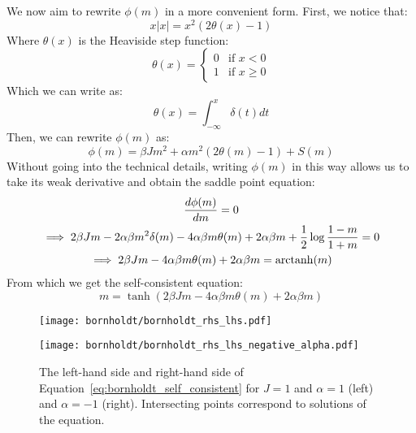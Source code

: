 We now aim to rewrite $\phi(m)$ in a more convenient form. First, we notice that:
\begin{equation}
    x|x| = x^2 (2\theta(x)-1)
\end{equation}
Where $\theta(x)$ is the Heaviside step function:
\begin{equation}
    \theta(x) = \begin{cases}
        0 & \text{if } x < 0\\
        1 & \text{if } x \geq 0
    \end{cases}
\end{equation}
Which we can write as:
\begin{equation}
    \theta(x) = \int_{-\infty}^{x} \delta(t) dt
\end{equation}
Then, we can rewrite $\phi(m)$ as:
\begin{equation}
    \phi(m) = \beta J m^2 + \alpha m^2 (2\theta(m)-1) + S(m)
\end{equation}
Without going into the technical details, writing $\phi(m)$ in this way allows us to take its weak derivative and obtain the saddle point equation:
\begin{equation}
    \begin{gathered}
        \frac{d \phi(m)}{d m} = 0\\
        \implies 2\beta J m - 2 \alpha \beta m^2 \delta(m) - 4 \alpha \beta m \theta(m) + 2\alpha \beta m + \frac{1}{2} \log \frac{1-m}{1+m} = 0\\
        \implies 2\beta J m - 4 \alpha \beta m \theta(m) + 2\alpha \beta m = \operatorname{arctanh}(m)\\
    \end{gathered}
\end{equation}
From which we get the self-consistent equation:
\begin{equation}
    m = \tanh\left(2\beta J m - 4 \alpha \beta m \theta(m) + 2\alpha \beta m\right)
    \label{eq:bornholdt_self_consistent}
\end{equation}

\begin{figure}[h]
    \centering
    \begin{minipage}[t]{0.45\textwidth}
        \centering
        \texttt{[image: bornholdt/bornholdt\_rhs\_lhs.pdf]}

    \end{minipage}
    \hfill
    \begin{minipage}[t]{0.45\textwidth}
        \centering
        \texttt{[image: bornholdt/bornholdt\_rhs\_lhs\_negative\_alpha.pdf]}
    \end{minipage}
    \caption{The left-hand side and right-hand side of Equation~\ref{eq:bornholdt_self_consistent} for $J=1$ and $\alpha=1$ (left) and $\alpha=-1$ (right). Intersecting points correspond to solutions of the equation.}
    \label{fig:bornholdt_rhs_lhs}
\end{figure}

